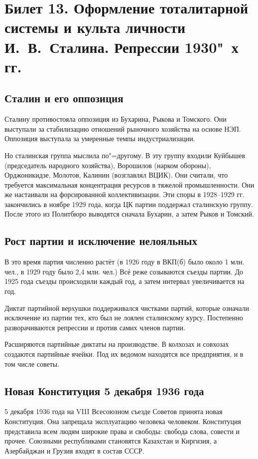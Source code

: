 \section{Билет 13. Оформление тоталитарной системы и культа личности И.~В.~Сталина. Репрессии 1930"~х гг.}

\subsection{Сталин и его оппозиция}

Сталину противостояла оппозиция из Бухарина, Рыкова и Томского. Они выступали за стабилизацию отношений рыночного хозяйства на основе НЭП. Оппозиция выступала за умеренные темпы индустриализации.

Но сталинская группа мыслила по"=другому. В эту группу входили Куйбышев (председатель народного хозяйства), Ворошилов (нарком обороны), Орджоникидзе, Молотов, Калинин (возглавлял ВЦИК). Они считали, что требуется максимальная концентрация ресурсов в тяжелой промышленности. Они же настаивали на форсированной коллективизации. Эти споры в 1928--1929 гг. закончились в ноябре 1929 года, когда ЦК партии поддержал сталинскую группу. После этого из Политбюро выводятся сначала Бухарин, а затем Рыков и Томский.

\subsection{Рост партии и исключение нелояльных}

В это время партия численно растёт (в 1926 году в ВКП(б) было около 1 млн. чел., в 1929 году было 2,4 млн. чел.) Всё реже созываются съезды партии. До 1925 года съезды происходили каждый год, а затем интервал увеличивается на год. 

Диктат партийной верхушки поддерживался чистками партий, которые означали исключение из партии тех, кто был не лоялен сталинскому курсу. Постепенно разворачиваются репрессии и против самих членов партии.

Расширяются партийные диктаты на производстве. В колхозах и совхозах создаются партийные ячейки. Под их ведомом находятся все предприятия, и в том числе советы.

\subsection{Новая Конституция 5 декабря 1936 года}

5 декабря 1936 года на VIII Всесоюзном съезде Советов принята новая Конституция. Она запрещала эксплуатацию человека человеком. Конституция представила всем людям широкие права и свободы: свобода слова, совести и прочее. Союзными республиками становятся Казахстан и Киргизия, а Азербайджан и Грузия входят в состав СССР.

